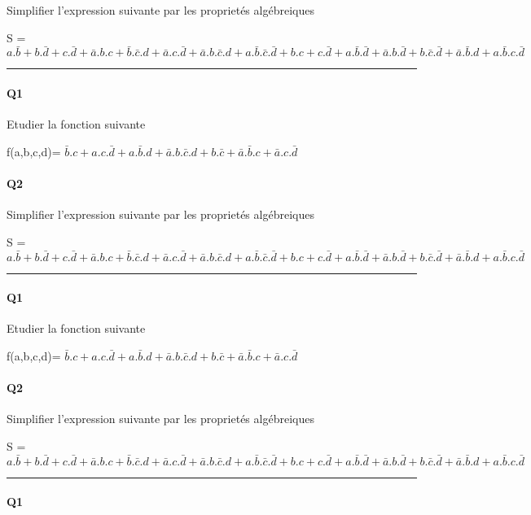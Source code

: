 Simplifier l'expression suivante par les proprietés algébreiques 

S = $a.\bar b+b.\bar d+c.\bar d+\bar a.b.c+\bar b.\bar c.d + \bar a.c.\bar d+\bar a.b.\bar c.d+a.\bar b.\bar c.\bar d + b.c+c.\bar d+a.\bar b.\bar d+\bar a.b.\bar d + b.\bar c.\bar d+\bar a.\bar b.d+a.\bar b.c.\bar d$

\hrule width 1\linewidth
\paragraph{Q1}

Etudier la fonction suivante

f(a,b,c,d)= $\bar b.c+a.c.\bar d+a.\bar b.d+\bar a.b.\bar c.d + b.\bar c+\bar a.\bar b.c+\bar a.c.\bar d$

\paragraph{Q2}

Simplifier l'expression suivante par les proprietés algébreiques 

S = $a.\bar b+b.\bar d+c.\bar d+\bar a.b.c+\bar b.\bar c.d + \bar a.c.\bar d+\bar a.b.\bar c.d+a.\bar b.\bar c.\bar d + b.c+c.\bar d+a.\bar b.\bar d+\bar a.b.\bar d + b.\bar c.\bar d+\bar a.\bar b.d+a.\bar b.c.\bar d$

\hrule width 1\linewidth
\paragraph{Q1}

Etudier la fonction suivante

f(a,b,c,d)= $\bar b.c+a.c.\bar d+a.\bar b.d+\bar a.b.\bar c.d + b.\bar c+\bar a.\bar b.c+\bar a.c.\bar d$

\paragraph{Q2}

Simplifier l'expression suivante par les proprietés algébreiques 

S = $a.\bar b+b.\bar d+c.\bar d+\bar a.b.c+\bar b.\bar c.d + \bar a.c.\bar d+\bar a.b.\bar c.d+a.\bar b.\bar c.\bar d + b.c+c.\bar d+a.\bar b.\bar d+\bar a.b.\bar d + b.\bar c.\bar d+\bar a.\bar b.d+a.\bar b.c.\bar d$

\hrule width 1\linewidth
\paragraph{Q1}

